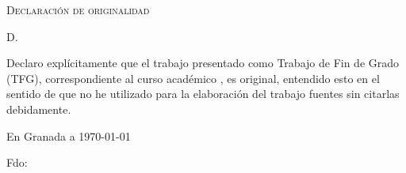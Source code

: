 %

\thispagestyle{empty}

\hfill\vfill

\textsc{Declaración de originalidad}\\\bigskip

D. \miNombre \\\medskip

Declaro explícitamente que el trabajo presentado como Trabajo de Fin de Grado (TFG), correspondiente al curso académico \miCurso, es original, entendido esto en el sentido de que no he utilizado para la elaboración del trabajo fuentes sin citarlas debidamente.
\medskip

En Granada a \today 
\vspace{3cm}
\begin{center} 
Fdo: \miNombre 

\end{center}

\vfill

\clearpage
\endinput
